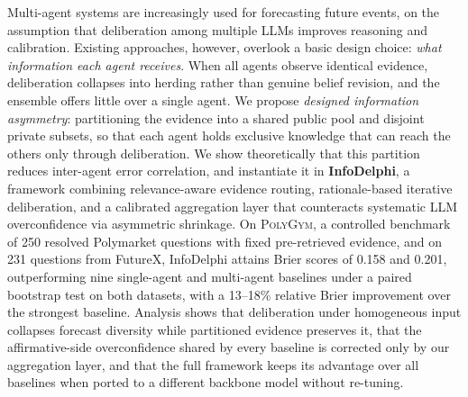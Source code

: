 Multi-agent systems are increasingly used for forecasting future events, on the assumption that deliberation among multiple LLMs improves reasoning and calibration.
Existing approaches, however, overlook a basic design choice: \emph{what information each agent receives}.
When all agents observe identical evidence, deliberation collapses into herding rather than genuine belief revision, and the ensemble offers little over a single agent.
We propose \emph{designed information asymmetry}: partitioning the evidence into a shared public pool and disjoint private subsets, so that each agent holds exclusive knowledge that can reach the others only through deliberation.
We show theoretically that this partition reduces inter-agent error correlation, and instantiate it in \textbf{InfoDelphi}, a framework combining relevance-aware evidence routing, rationale-based iterative deliberation, and a calibrated aggregation layer that counteracts systematic LLM overconfidence via asymmetric shrinkage.
On \textsc{PolyGym}, a controlled benchmark of 250 resolved Polymarket questions with fixed pre-retrieved evidence, and on 231 questions from FutureX, InfoDelphi attains Brier scores of 0.158 and 0.201, outperforming nine single-agent and multi-agent baselines under a paired bootstrap test on both datasets, with a 13--18\% relative Brier improvement over the strongest baseline.
Analysis shows that deliberation under homogeneous input collapses forecast diversity while partitioned evidence preserves it, that the affirmative-side overconfidence shared by every baseline is corrected only by our aggregation layer, and that the full framework keeps its advantage over all baselines when ported to a different backbone model without re-tuning.
